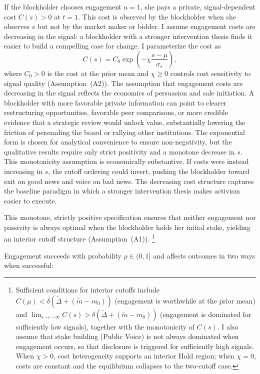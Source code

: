 \documentclass[11pt]{article}
\newcommand{\1}{\mathbf{1}}
\begin{document}
If the blockholder chooses engagement $a = 1$, she pays a private, signal-dependent cost $C(s) > 0$ at $t = 1$. This cost is observed by the blockholder when she observes $s$ but not by the market maker or bidder. I assume engagement costs are decreasing in the signal: a blockholder with a stronger intervention thesis finds it easier to build a compelling case for change. I parameterize the cost as
\[
C(s) = C_0 \exp\!\left(-\chi \frac{s - \mu}{\sigma_s}\right),
\]
where $C_0 > 0$ is the cost at the prior mean and $\chi \geq 0$ controls cost sensitivity to signal quality (Assumption~\textup{(A2)}). The assumption that engagement costs are decreasing in the signal reflects the economics of persuasion and sale initiation. A blockholder with more favorable private information can point to clearer restructuring opportunities, favorable peer comparisons, or more credible evidence that a strategic review would unlock value, substantially lowering the friction of persuading the board or rallying other institutions. The exponential form is chosen for analytical convenience to ensure non-negativity, but the qualitative results require only strict positivity and a monotone decrease in $s$. This monotonicity assumption is economically substantive. If costs were instead increasing in $s$, the cutoff ordering could invert, pushing the blockholder toward exit on good news and voice on bad news. The decreasing cost structure captures the baseline paradigm in which a stronger intervention thesis makes activism easier to execute.

This monotone, strictly positive specification ensures that neither engagement nor passivity is always optimal when the blockholder holds her initial stake, yielding an interior cutoff structure (Assumption~\textup{(A1)}).%
\footnote{Sufficient conditions for interior cutoffs include $C(\mu) < \delta(\tilde{\Delta} + (\tilde{m}-m_0))$ (engagement is worthwhile at the prior mean) and $\lim_{s\to-\infty} C(s) > \delta(\tilde{\Delta} + (\tilde{m}-m_0))$ (engagement is dominated for sufficiently low signals), together with the monotonicity of $C(s)$. I also assume that stake building (Public Voice) is not always dominated when engagement occurs, so that disclosure is triggered for sufficiently high signals. When $\chi > 0$, cost heterogeneity supports an interior Hold region; when $\chi = 0$, costs are constant and the equilibrium collapses to the two-cutoff case.}

Engagement succeeds with probability $\rho \in (0,1]$ and affects outcomes in two ways when successful:
\end{document}
